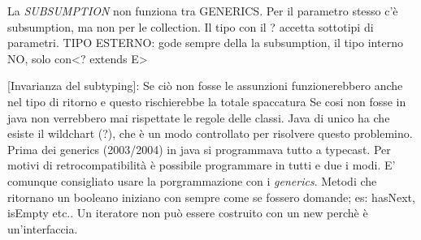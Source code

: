 La \textit{SUBSUMPTION} non funziona tra GENERICS. Per il parametro stesso c'è subsumption, ma non per le collection. Il tipo con
 il ? accetta sottotipi di parametri.
\newline
TIPO ESTERNO: gode sempre della la subsumption, il tipo interno NO, solo con<? extends E>  \newline

[Invarianza del subtyping]: Se ciò non fosse le assunzioni funzionerebbero anche nel tipo di ritorno e questo rischierebbe la totale spaccatura \newline
Se cosi non fosse in java non verrebbero mai rispettate le regole delle classi. \newline
Java di unico ha che esiste il wildchart (?), che è un modo controllato per risolvere questo problemino. \newline
Prima dei generics (2003/2004) in java si programmava tutto a typecast. Per motivi di retrocompatibilità è possibile programmare in tutti e due i modi. E' comunque consigliato usare la porgrammazione con i \textit{generics}. \newline
Metodi che ritornano un booleano iniziano con sempre come se fossero domande; es: hasNext, isEmpty etc.. \newline
Un iteratore non può essere costruito con un new perchè è un'interfaccia. 



\newpage
